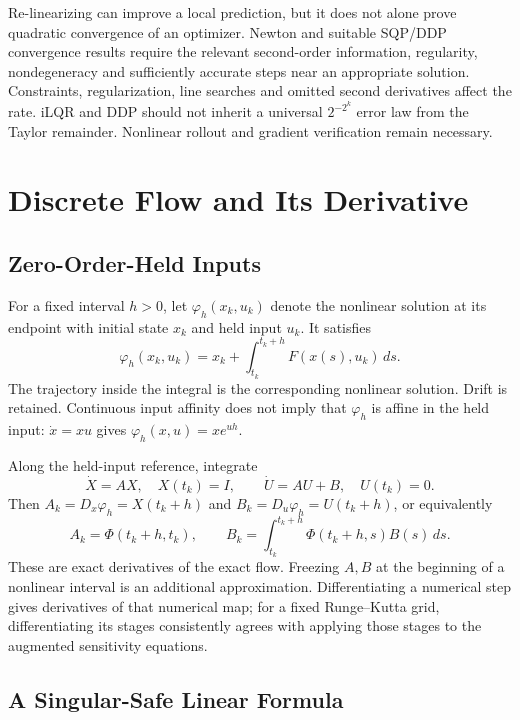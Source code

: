 Re-linearizing can improve a local prediction, but it does not alone prove quadratic convergence of an optimizer. Newton and suitable SQP/DDP convergence results require the relevant second-order information, regularity, nondegeneracy and sufficiently accurate steps near an appropriate solution. Constraints, regularization, line searches and omitted second derivatives affect the rate. iLQR and DDP should not inherit a universal $2^{-2^k}$ error law from the Taylor remainder. Nonlinear rollout and gradient verification remain necessary.

\section{Discrete Flow and Its Derivative}

\subsection{Zero-Order-Held Inputs}

For a fixed interval $h>0$, let $\varphi_h(x_k,u_k)$ denote the nonlinear solution at its endpoint with initial state $x_k$ and held input $u_k$. It satisfies
\begin{equation}
\varphi_h(x_k,u_k)=x_k+
\int_{t_k}^{t_k+h}F(x(s),u_k)\,ds.
\end{equation}
The trajectory inside the integral is the corresponding nonlinear solution. Drift is retained. Continuous input affinity does not imply that $\varphi_h$ is affine in the held input: $\dot x=xu$ gives $\varphi_h(x,u)=xe^{uh}$.

Along the held-input reference, integrate
\begin{equation}
\dot X=AX,\quad X(t_k)=I,
\qquad \dot U=AU+B,\quad U(t_k)=0.
\end{equation}
Then $A_k=D_x\varphi_h=X(t_k+h)$ and $B_k=D_u\varphi_h=U(t_k+h)$, or equivalently
\begin{equation}
A_k=\Phi(t_k+h,t_k),\qquad
B_k=\int_{t_k}^{t_k+h}\Phi(t_k+h,s)B(s)\,ds.
\label{eq:ch2:discrete-jacobians}
\end{equation}
These are exact derivatives of the exact flow. Freezing $A,B$ at the beginning of a nonlinear interval is an additional approximation. Differentiating a numerical step gives derivatives of that numerical map; for a fixed Runge--Kutta grid, differentiating its stages consistently agrees with applying those stages to the augmented sensitivity equations.

\subsection{A Singular-Safe Linear Formula}


